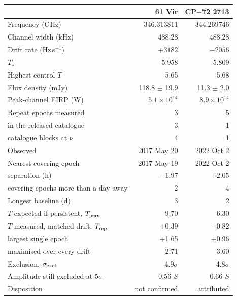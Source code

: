 \begin{tabular}{@{}>{\raggedright\arraybackslash}p{}@{~~}r@{~~}r@{}}
\hline
 & 61 Vir & CP$-$72 2713 \\
\hline
Frequency (GHz) & 346.313811 & 344.269746 \\
Channel width (kHz) & 488.28 & 488.28 \\
Drift rate (Hz\,s$^{-1}$) & $+3182$ & $-2056$ \\
$T_\star$ & 5.958 & 5.809 \\
Highest control $T$ & 5.65 & 5.68 \\
Flux density (mJy) & 118.8 $\pm$ 19.9 & 11.3 $\pm$ 2.0 \\
Peak-channel EIRP (W) & $5.1 \times 10^{14}$ & $8.9 \times 10^{14}$ \\
Repeat epochs measured & 3 & 5 \\
\quad in the released catalogue & 3 & 1 \\
\quad catalogue blocks at $\nu$ & 4 & 1 \\
Observed & 2017 May 20 & 2022 Oct 2 \\
Nearest covering epoch & 2017 May 19 & 2022 Oct 2 \\
\quad separation (h) & $-1.97$ & $+2.05$ \\
\quad covering epochs more than a day away & 2 & 4 \\
Longest baseline (d) & 3 & 2 \\
$T$ expected if persistent, $T_{\rm pers}$ & 9.70 & 6.30 \\
$T$ measured, matched drift, $T_{\rm rep}$ & +0.39 & -0.82 \\
\quad largest single epoch & +1.65 & +0.96 \\
\quad maximised over every drift & 2.71 & 3.60 \\
Exclusion, $\sigma_{\rm excl}$ & 4.9$\sigma$ & 4.8$\sigma$ \\
Amplitude still excluded at $5\sigma$ & 0.56 $S$ & 0.66 $S$ \\
Disposition & not confirmed & attributed \\
\hline
\end{tabular}
